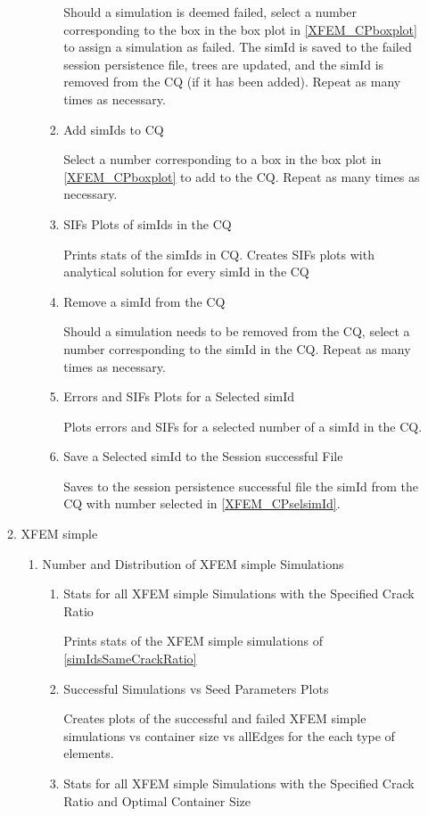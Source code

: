 \documentclass[10pt,a4paper]{article}
\begin{document}
\begin{enumerate}
\begin{enumerate}
\begin{enumerate}
\begin{enumerate}
Should a simulation is deemed failed, select a number corresponding to the box in the box plot in \ref{XFEM_CPboxplot} to assign a simulation as failed. The simId is saved to the failed session persistence file, trees are updated, and the simId is removed from the CQ (if it has been added). Repeat as many times as necessary.
\item Add simIds to CQ

Select a number corresponding to a box in the box plot in \ref{XFEM_CPboxplot} to add to the CQ. Repeat as many times as necessary.
\item SIFs Plots of simIds in the CQ

Prints stats of the simIds in CQ. Creates SIFs plots with analytical solution for every simId in the CQ
\item Remove a simId from the CQ

Should a simulation needs to be removed from the CQ, select a number corresponding to the simId in the CQ. Repeat as many times as necessary.
\item Errors and SIFs Plots for a Selected simId\label{XFEM_CPselsimId}

Plots errors and SIFs for a selected number of a simId in the CQ.
\item Save a Selected simId to the Session successful File

Saves to the session persistence successful file the simId from the CQ with number selected in \ref{XFEM_CPselsimId}.
\end{enumerate}
\end{enumerate}


\item XFEM simple
\begin{enumerate}
\item Number and Distribution of XFEM simple Simulations
\begin{enumerate}
\item Stats for all XFEM simple Simulations with the Specified Crack Ratio

Prints stats of the XFEM simple simulations of \ref{simIdsSameCrackRatio}
\item Successful Simulations vs Seed Parameters Plots

Creates plots of the successful and failed XFEM simple simulations vs container size vs allEdges for the each type of elements.

\item Stats for all XFEM simple Simulations with the Specified Crack Ratio and Optimal Container Size


\end{enumerate}
\end{enumerate}
\end{enumerate}
\end{enumerate}
\end{document}
